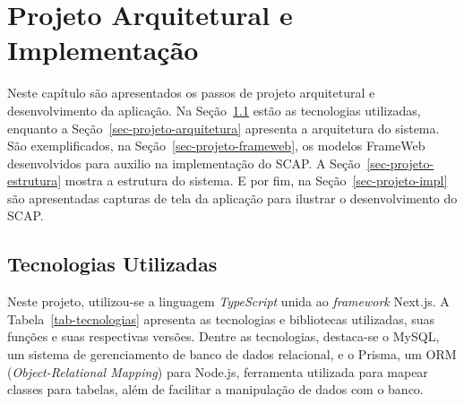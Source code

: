 \chapter{Projeto Arquitetural e Implementação}
\label{chap-projeto}

Neste capítulo
são apresentados os passos de projeto arquitetural e desenvolvimento da aplicação.
Na Seção~\ref{sec-projeto-tecnologias} estão as tecnologias utilizadas, enquanto a Seção~\ref{sec-projeto-arquitetura}
apresenta a arquitetura do sistema. São exemplificados, na Seção~\ref{sec-projeto-frameweb},
os modelos FrameWeb desenvolvidos para auxilio na implementação do SCAP. A Seção~\ref{sec-projeto-estrutura}
mostra a estrutura do sistema. E por fim, na Seção~\ref{sec-projeto-impl} são apresentadas capturas de
tela da aplicação para ilustrar o desenvolvimento do SCAP.



\section{Tecnologias Utilizadas}
\label{sec-projeto-tecnologias}

Neste projeto, utilizou-se a linguagem \textit{TypeScript} unida ao \textit{framework} Next.js.
A Tabela~\ref{tab-tecnologias} apresenta as tecnologias e bibliotecas utilizadas, suas funções e suas respectivas versões.
Dentre as tecnologias, destaca-se o MySQL, um sistema de gerenciamento de banco de dados relacional,
e o Prisma, um ORM (\textit{Object-Relational Mapping}) para Node.js, ferramenta utilizada
para mapear classes para tabelas, além de facilitar a manipulação de dados com o banco.

